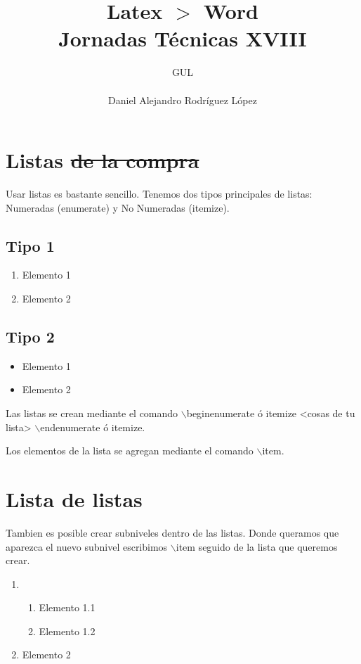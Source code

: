 \documentclass[10pt,a4paper,titlepage]{article} %
\title{ \textbf{ \Huge{Latex $>$ Word}} \\ Jornadas Técnicas XVIII}
\author{
		\begin{tabular}{l}
			\multicolumn{1}{l}{GUL} \\ \hline \\
			Daniel Alejandro Rodríguez López \\
		\end{tabular}
}
\begin{document}
\maketitle

\newpage

\section*{Listas \sout{de la compra}}
	Usar listas es bastante sencillo. Tenemos dos tipos principales de listas: Numeradas (enumerate) y No Numeradas (itemize).

	\subsection*{Tipo 1}
		\begin{enumerate}
			\item Elemento 1
			\item Elemento 2
		\end{enumerate}

	\subsection*{Tipo 2}
		\begin{itemize}
			\item Elemento 1
			\item Elemento 2
		\end{itemize}

	Las listas se crean mediante el comando $\backslash$begin{enumerate ó itemize} <cosas de tu lista> $\backslash$end{enumerate ó itemize}.

	Los elementos de la lista se agregan mediante el comando $\backslash$item.

\section*{Lista de listas}
	Tambien es posible crear subniveles dentro de las listas. Donde queramos que aparezca el nuevo subnivel escribimos $\backslash$item seguido de la lista que queremos crear.
	\begin{enumerate}
		\item \begin{enumerate}
			\item Elemento 1.1
			\item Elemento 1.2
		\end{enumerate}
		\item Elemento 2
	\end{enumerate}
\end{document}
